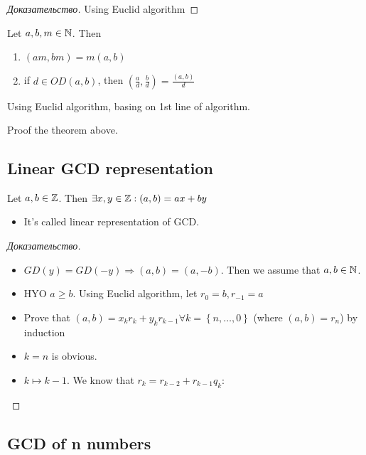 \begin{proof}[Доказательство]
	Using Euclid algorithm 
\end{proof}

\begin{theorem}[]
	Let $a,b,m \in \mathbb{N}$. Then
	\begin{enumerate}
		\item $(am, bm) = m(a,b)$
		\item if $d \in OD(a,b)$, then $(\frac{a}{d}, \frac{b}{d}) = \frac{(a,b)}{d}$ 
	\end{enumerate}
\end{theorem}

\begin{note}[]
	Using Euclid algorithm, basing on 1st line of algorithm.
\end{note}

\begin{exercise}
	Proof the theorem above.
\end{exercise}

\subsection{Linear GCD representation}

\begin{theorem}[]
	Let $a,b \in \mathbb{Z}$. Then $\exists x,y \in \mathbb{Z}: (a,b) = ax + by$ 
	\begin{itemize}
		\item It's called linear representation of GCD.
	\end{itemize}
\end{theorem}

\begin{proof}[Доказательство]
	\begin{itemize}
		\item $GD(y) = GD(-y) \Rightarrow (a,b) = (a, -b)$. Then we assume that $a,b \in \mathbb{N}$.
		\item HYO  $a \geq b$. Using Euclid algorithm, let $r_0 = b, r_{-1} = a$
		\item Prove that $(a,b) = x_k r_k + y_k r_{k-1} \forall k = \left\{ n, \dots , 0 \right \} $ (where $(a,b) = r_{n}$) by induction 
		\item $k = n$ is obvious.
		\item $k \mapsto k-1$. We know that $r_k = r_{k-2} + r_{k-1} q_k$:
	\end{itemize}
\end{proof}

\subsection{GCD of n numbers}

